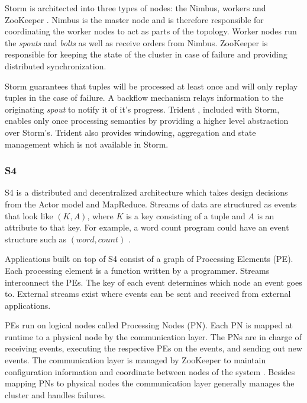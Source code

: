 \documentclass[12pt]{article}
\begin{document}
Storm is architected into three types of nodes: the Nimbus, workers and ZooKeeper \cite{zookeeper}. Nimbus is the master node and is therefore responsible for coordinating the worker nodes to act as parts of the topology. Worker nodes run the \textit{spouts} and \textit{bolts} as well as receive orders from Nimbus. ZooKeeper is responsible for keeping the state of the cluster in case of failure and providing distributed synchronization.

Storm guarantees that tuples will be processed at least once and will only replay tuples in the case of failure. A backflow mechanism relays information to the originating \textit{spout} to notify it of it's progress. Trident \cite{toshniwal2014storm}, included with Storm, enables only once processing semantics by providing a higher level abstraction over Storm's. Trident also provides windowing, aggregation and state management which is not available in Storm.



\subsubsection{S4}

S4 \cite{neumeyer2010s4} is a distributed and decentralized architecture which takes design decisions from the Actor model and MapReduce. Streams of data are structured as events that look like $(K, A)$, where $K$ is a key consisting of a tuple and $A$ is an attribute to that key. For example, a word count program could have an event structure such as $(word, count)$ \cite{zhang2016survey}.

Applications built on top of S4 consist of a graph of Processing Elements (PE). Each processing element is a function written by a programmer. Streams interconnect the PEs. The key of each event determines which node an event goes to. External streams exist where events can be sent and received from external applications.

PEs run on logical nodes called Processing Nodes (PN). Each PN is mapped at runtime to a physical node by the communication layer. The PNs are in charge of receiving events, executing the respective PEs on the events, and sending out new events. The communication layer is managed by ZooKeeper \cite{zookeeper} to maintain configuration information and coordinate between nodes of the system \cite{neumeyer2010s4}. Besides mapping PNs to physical nodes the communication layer generally manages the cluster and handles failures.
\end{document}
